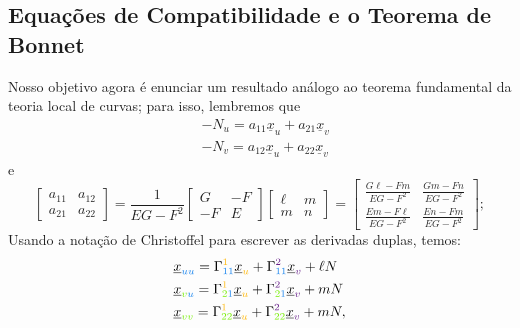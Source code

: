 \documentclass[../differential_geometry.tex]{subfiles}
\begin{document}
\subsection{Equações de Compatibilidade e o Teorema de Bonnet}
Nosso objetivo agora é enunciar um resultado análogo ao teorema fundamental da teoria local de curvas; para isso, lembremos que
\begin{align*}
	 & -N_{u} = a_{11}\underline{x}_u + a_{21}\underline{x}_v     \\
	 & -N_{v} = a_{12}\underline{x}_{u} + a_{22}\underline{x}_{v}
\end{align*}
e
\[
	\begin{bmatrix}
		a_{11} & a_{12} \\
		a_{21} & a_{22}
	\end{bmatrix} = \frac{1}{EG - F^{2}}\begin{bmatrix}
		G  & -F \\
		-F & E
	\end{bmatrix} \begin{bmatrix}
		\ell & m \\
		m    & n
	\end{bmatrix} = \begin{bmatrix}
		\frac{G \ell -Fm}{EG-F^{2}}   & \frac{Gm - Fn}{EG-F^{2}}   \\
		\frac{Em - F \ell }{EG-F^{2}} & \frac{En - Fm}{EG - F^{2}}
	\end{bmatrix};
\]
Usando a notação de Christoffel para escrever as derivadas duplas, temos:
\begin{align*}
	 & \underline{x}_{{\color{DodgerBlue2}uu}} = \Gamma_{{\color{DodgerBlue2}11}}^{{\color{DarkGoldenrod1}1}}\underline{x}_{{\color{DarkGoldenrod1}u}} + \Gamma_{{\color{DodgerBlue2}11}}^{{\color{DarkOrchid4}2}}\underline{x}_{{\color{DarkOrchid4}v}} + \ell N                                                            \\
	 & \underline{x}_{{\color{Chartreuse2}v}{\color{DodgerBlue2}u}} = \Gamma_{{\color{Chartreuse2}2}{\color{DodgerBlue2}1}}^{{\color{DarkGoldenrod1}1}}\underline{x}_{{\color{DarkGoldenrod1}u}} + \Gamma_{{\color{Chartreuse2}2}{\color{DodgerBlue2}1}}^{{\color{DarkOrchid4}2}}\underline{x}_{{\color{DarkOrchid4}v}}+mN   \\
	 & \underline{x}_{{\color{Chartreuse2}vv}} = \Gamma_{{\color{Chartreuse2} 22}}^{{\color{DarkGoldenrod1}1}}\underline{x}_{{\color{DarkGoldenrod1}u}} + \Gamma_{{\color{Chartreuse2} 22}}^{{\color{DarkOrchid4}2}}\underline{x}_{{\color{DarkOrchid4}v}}+mN                                                              ,
\end{align*}
\end{document}
